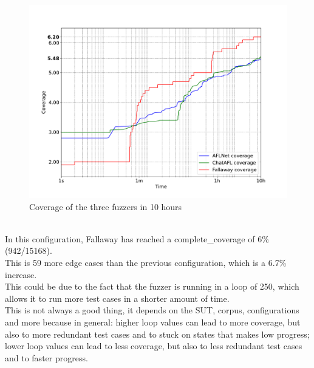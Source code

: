 \begin{figure}[H]
    \centering
    \includegraphics[width=1\textwidth]{Images/coverage_over_time_lighttpd-10h.pdf}
    \caption{Coverage of the three fuzzers in 10 hours}
    \label{fig:coverage_10hours}
\end{figure}
\phantom{}\\
In this configuration, Fallaway has reached a complete\_coverage of 6\% (942/15168).
\\This is 59 more edge cases than the previous configuration, which is a 6.7\% increase.
\\This could be due to the fact that the fuzzer is running in a loop of 250, which allows it to run more test cases in a shorter amount of time.
\\This is not always a good thing, it depends on the SUT, corpus, configurations and more because in general: higher loop values can lead to more coverage, but also to more redundant test cases and to stuck on states that makes low progress; lower loop values can lead to less coverage, but also to less redundant test cases and to faster progress.
